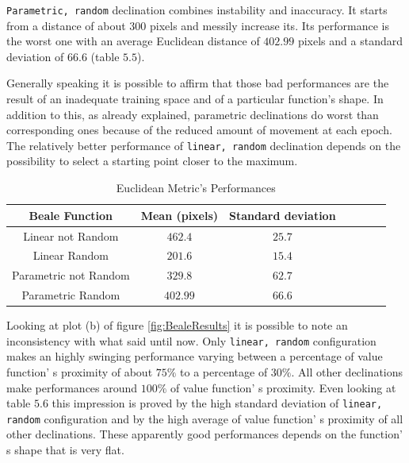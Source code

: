 {\tt Parametric, random} declination combines instability and inaccuracy. It starts from a distance of about $300$ pixels and messily increase its. Its performance is the worst one with an average Euclidean distance of $402.99$ pixels and a standard deviation of $66.6$ (table $5.5$).

Generally speaking it is possible to affirm that those bad performances are the result of an inadequate training space and of a particular function's shape. In addition to this, as already explained, parametric declinations do worst than corresponding ones because of the reduced amount of movement at each epoch. The relatively better performance of {\tt linear, random} declination depends on the possibility to select a starting point closer to the maximum. \\

\begin{table}[h!]
\centering
\resizebox{\linewidth}{!} {
	\begin{tabular}{c| cccccc} 
		\hline \textbf{Beale Function}
		& \textbf{Mean (pixels)} & \textbf{Standard deviation} \\ 
		\hline Linear not Random
		& $462.4$ & $25.7$\\ 
		\hline Linear Random
		& \cellcolor{red!25}$201.6$ & \cellcolor{red!25}$15.4$\\ 
		\hline Parametric not Random
		& $329.8$ & $62.7$\\ 
		\hline Parametric Random
		& $402.99$ & $66.6$ \\ 
		\hline 
	\end{tabular} 
}
\label{BealeTabEuclidean}
\caption{Euclidean Metric's Performances}
\end{table}

Looking at plot (b) of figure \ref{fig:BealeResults} it is possible to note an inconsistency with what said until now. Only {\tt linear, random} configuration makes an highly swinging performance varying between a percentage of value function' s proximity of about $75\%$ to a percentage of $30\%$. All other declinations make performances around $100\%$ of value function' s proximity. Even looking at table $5.6$ this impression is proved by the high standard deviation of {\tt linear, random} configuration and by the high average of value function' s proximity of all other declinations. These apparently good performances depends on the function' s shape that is very flat. 

